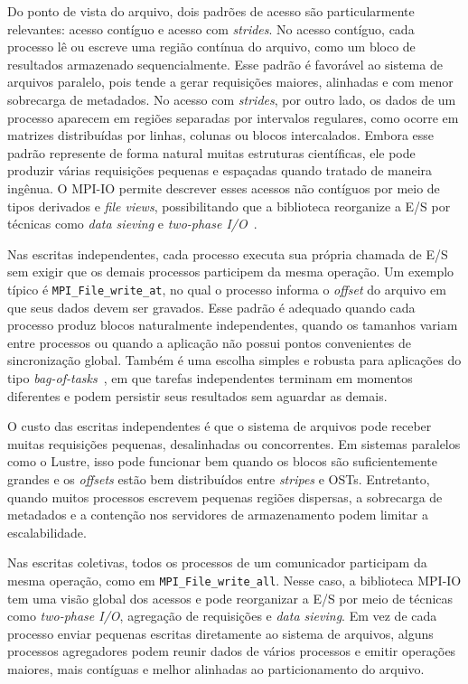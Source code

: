 Do ponto de vista do arquivo, dois padrões de acesso são particularmente
relevantes: acesso contíguo e acesso com \textit{strides}. No acesso
contíguo, cada processo lê ou escreve uma região contínua do arquivo, como um
bloco de resultados armazenado sequencialmente. Esse padrão é favorável ao
sistema de arquivos paralelo, pois tende a gerar requisições maiores,
alinhadas e com menor sobrecarga de metadados. No acesso com
\textit{strides}, por outro lado, os dados de um processo aparecem em regiões
separadas por intervalos regulares, como ocorre em matrizes distribuídas por
linhas, colunas ou blocos intercalados. Embora esse padrão represente de
forma natural muitas estruturas científicas, ele pode produzir várias
requisições pequenas e espaçadas quando tratado de maneira ingênua. O MPI-IO
permite descrever esses acessos não contíguos por meio de tipos derivados e
\textit{file views}, possibilitando que a biblioteca reorganize a E/S por
técnicas como \textit{data sieving} e \textit{two-phase I/O}~\cite{mpiCite,Rr:10,Wre:99}.

Nas escritas independentes, cada processo executa sua própria chamada de
E/S sem exigir que os demais processos participem da mesma operação. Um
exemplo típico é \texttt{MPI\_File\_write\_at}, no qual o processo informa o
\textit{offset} do arquivo em que seus dados devem ser gravados. Esse padrão
é adequado quando cada processo produz blocos naturalmente
independentes, quando os tamanhos variam entre processos ou quando a
aplicação não possui pontos convenientes de sincronização global. Também é
uma escolha simples e robusta para aplicações do tipo \textit{bag-of-tasks}~\cite{Cirne:2003},
em que tarefas independentes terminam em momentos diferentes e podem
persistir seus resultados sem aguardar as demais.

O custo das escritas independentes é que o sistema de arquivos pode receber
muitas requisições pequenas, desalinhadas ou concorrentes. Em sistemas
paralelos como o Lustre, isso pode funcionar bem quando os blocos são
suficientemente grandes e os \textit{offsets} estão bem distribuídos entre
\textit{stripes} e OSTs. Entretanto, quando muitos processos escrevem
pequenas regiões dispersas, a sobrecarga de metadados e a contenção nos
servidores de armazenamento podem limitar a escalabilidade.

Nas escritas coletivas, todos os processos de um comunicador participam da
mesma operação, como em \texttt{MPI\_File\_write\_all}. Nesse caso, a
biblioteca MPI-IO tem uma visão global dos acessos e pode reorganizar a E/S
por meio de técnicas como \textit{two-phase I/O}, agregação de requisições e
\textit{data sieving}. Em vez de cada processo enviar pequenas escritas
diretamente ao sistema de arquivos, alguns processos agregadores podem
reunir dados de vários processos e emitir operações maiores, mais
contíguas e melhor alinhadas ao particionamento do arquivo.

